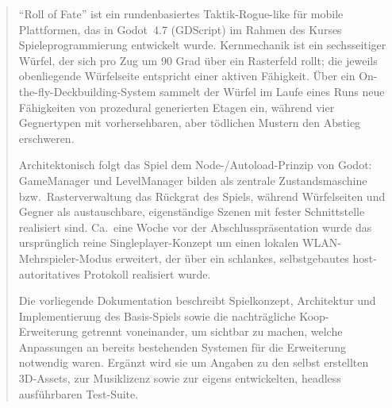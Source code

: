 \documentclass[oneside]{ausarbeitung}
\begin{document}
\maketitle
\cleardoublepage

\setcounter{page}{1}


\makeaffirmation
\cleardoublepage

\makeaiclause
\cleardoublepage


\begin{abstract}
\enquote{Roll of Fate} ist ein rundenbasiertes Taktik-Rogue-like für mobile Plattformen, das in Godot~4.7
(GDScript) im Rahmen des Kurses Spieleprogrammierung entwickelt wurde. Kernmechanik ist ein sechsseitiger
Würfel, der sich pro Zug um 90 Grad über ein Rasterfeld rollt; die jeweils obenliegende Würfelseite
entspricht einer aktiven Fähigkeit. Über ein On-the-fly-Deckbuilding-System sammelt der Würfel im Laufe
eines Runs neue Fähigkeiten von prozedural generierten Etagen ein, während vier Gegnertypen mit
vorhersehbaren, aber tödlichen Mustern den Abstieg erschweren.

Architektonisch folgt das Spiel dem Node-/Autoload-Prinzip von Godot: GameManager und LevelManager bilden
als zentrale Zustandsmaschine bzw.\ Rasterverwaltung das Rückgrat des Spiels, während Würfelseiten und
Gegner als austauschbare, eigenständige Szenen mit fester Schnittstelle realisiert sind. Ca.\ eine Woche
vor der Abschlusspräsentation wurde das ursprünglich reine Singleplayer-Konzept um einen lokalen
WLAN-Mehrspieler-Modus erweitert, der über ein schlankes, selbstgebautes host-autoritatives Protokoll
realisiert wurde.

Die vorliegende Dokumentation beschreibt Spielkonzept, Architektur und Implementierung des Basis-Spiels
sowie die nachträgliche Koop-Erweiterung getrennt voneinander, um sichtbar zu machen, welche Anpassungen
an bereits bestehenden Systemen für die Erweiterung notwendig waren. Ergänzt wird sie um Angaben zu den
selbst erstellten 3D-Assets, zur Musiklizenz sowie zur eigens entwickelten, headless ausführbaren
Test-Suite.
\end{abstract}

\cleardoublepage
\tableofcontents

\listofabbreviations
\begin{acronym}[KI]     %
\end{acronym}
\end{document}
